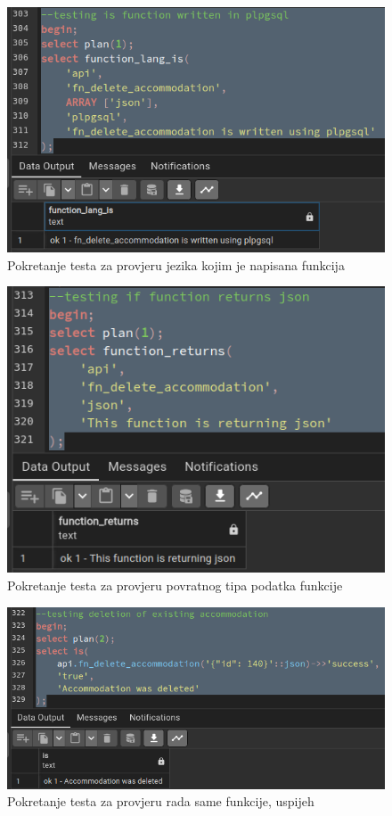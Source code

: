 				\begin{figure}[H]
					\centering
					\includegraphics[width=\textwidth]{slike/unit_tests/ut_5/func_lang.png}
					\caption{Pokretanje testa za provjeru jezika kojim je napisana funkcija}
					\label{fig: IS5-function_lang}
				\end{figure}
				\begin{figure}[H]
					\centering
					\includegraphics[width=\textwidth]{slike/unit_tests/ut_5/func_return.png}
					\caption{Pokretanje testa za provjeru povratnog tipa podatka funkcije}
					\label{fig: IS5-function_return}
				\end{figure}
				\begin{figure}[H]
					\centering
					\includegraphics[width=\textwidth]{slike/unit_tests/ut_5/success_invocation.png}
					\caption{Pokretanje testa za provjeru rada same funkcije, uspijeh}
					\label{fig: IS5-uspješno izbrisan smještaj}
				\end{figure}
